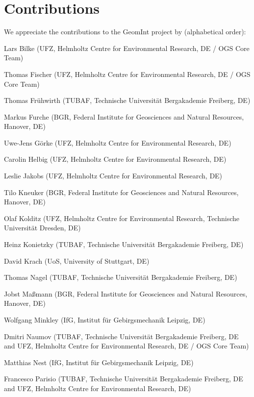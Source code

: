\chapter*{Contributions}

We appreciate the contributions to the GeomInt project by  (alphabetical order):

\begin{list}{-}{\leftmargin=1em \itemindent=0em \itemsep=0.1em}
\item Lars Bilke (UFZ, Helmholtz Centre for Environmental Research, DE / OGS Core Team)	
\item Thomas Fischer (UFZ, Helmholtz Centre for Environmental Research, DE / OGS Core Team)	
\item Thomas Fr\"uhwirth (TUBAF, Technische Universit\"at Bergakademie Freiberg, DE)	
\item Markus Furche (BGR, Federal Institute for Geosciences and Natural Resources, Hanover, DE)
\item Uwe-Jens G\"orke (UFZ, Helmholtz Centre for Environmental Research, DE)	
\item Carolin Helbig (UFZ, Helmholtz Centre for Environmental Research, DE)	
\item Leslie Jakobs (UFZ, Helmholtz Centre for Environmental Research, DE)
\item Tilo Kneuker (BGR, Federal Institute for Geosciences and Natural Resources, Hanover, DE)
\item Olaf Kolditz (UFZ, Helmholtz Centre for Environmental Research, Technische Universit\"at Dresden, DE) 
\item Heinz Konietzky (TUBAF, Technische Universit\"at Bergakademie Freiberg, DE)	
\item David Krach (UoS, University of Stuttgart, DE)	
\item Thomas Nagel (TUBAF, Technische Universit\"at Bergakademie Freiberg, DE) 
\item Jobst Ma{\ss}mann (BGR, Federal Institute for Geosciences and Natural Resources, Hanover, DE)
\item Wolfgang Minkley (IfG, Institut für Gebirgsmechanik Leipzig, DE)	
\item Dmitri Naumov (TUBAF, Technische Universit\"at Bergakademie Freiberg, DE and UFZ, Helmholtz Centre for Environmental Research, DE / OGS Core Team)	
\item Matthias Nest (IfG, Institut für Gebirgsmechanik Leipzig, DE)	
\item Francesco Parisio (TUBAF, Technische Universit\"at Bergakademie Freiberg, DE and UFZ, Helmholtz Centre for Environmental Research, DE)	

\end{list}
